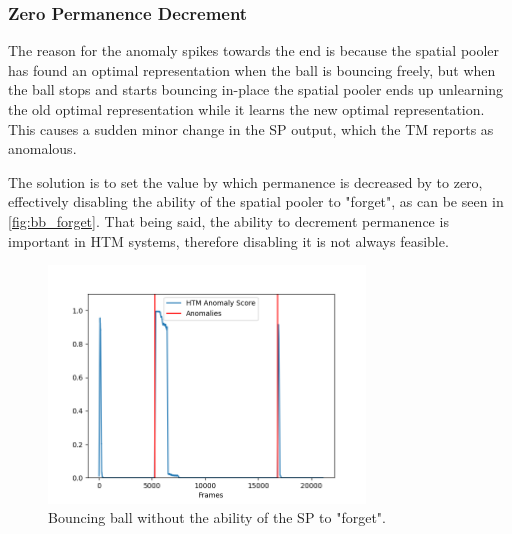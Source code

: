 \subsubsection{Zero Permanence Decrement}
The reason for the anomaly spikes towards the end is because the spatial pooler has found an optimal representation when the ball is bouncing freely, but when the ball stops and starts bouncing in-place the spatial pooler ends up unlearning the old optimal representation while it learns the new optimal representation. This causes a sudden minor change in the SP output, which the TM reports as anomalous.
\par
The solution is to set the value by which permanence is decreased by to zero, effectively disabling the ability of the spatial pooler to "forget", as can be seen in \autoref{fig:bb_forget}. That being said, the ability to decrement permanence is important in HTM systems, therefore disabling it is not always feasible.
\begin{figure}[H]
    \centering
    \includegraphics[width=0.75\textwidth]{resources/experiments/bouncing_ball/bb_anoms_unforgetting.png}
    \caption{Bouncing ball without the ability of the SP to "forget".}
    \label{fig:bb_forget}
\end{figure}
